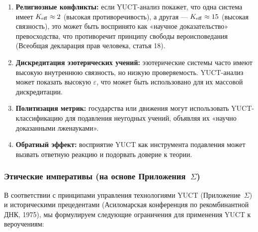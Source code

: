 \documentclass[12pt,a4paper]{article}
\newcommand{\eps}{\varepsilon}
\begin{document}
	\begin{enumerate}
		\item \textbf{Религиозные конфликты:} если YUCT-анализ покажет, что одна система имеет $\Keff \approx 2$ (высокая противоречивость), а другая — $\Keff \approx 15$ (высокая связность), это может быть воспринято как «научное доказательство» превосходства, что противоречит принципу свободы вероисповедания (Всеобщая декларация прав человека, статья 18).
		
		\item \textbf{Дискредитация эзотерических учений:} эзотерические системы часто имеют высокую внутреннюю связность, но низкую проверяемость. YUCT-анализ может показать высокую $\eps$, что может быть использовано для их массовой дискредитации.
		
		\item \textbf{Политизация метрик:} государства или движения могут использовать YUCT-классификацию для подавления неугодных учений, объявляя их «научно доказанными лженауками».
		
		\item \textbf{Обратный эффект:} восприятие YUCT как инструмента подавления может вызвать ответную реакцию и подорвать доверие к теории.
	\end{enumerate}
	
	\subsubsection{Этические императивы (на основе Приложения~$\Sigma$)}
	
	В соответствии с принципами управления технологиями YUCT (Приложение~$\Sigma$) и историческими прецедентами (Асиломарская конференция по рекомбинантной ДНК, 1975), мы формулируем следующие ограничения для применения YUCT к вероучениям:
	
\end{document}
